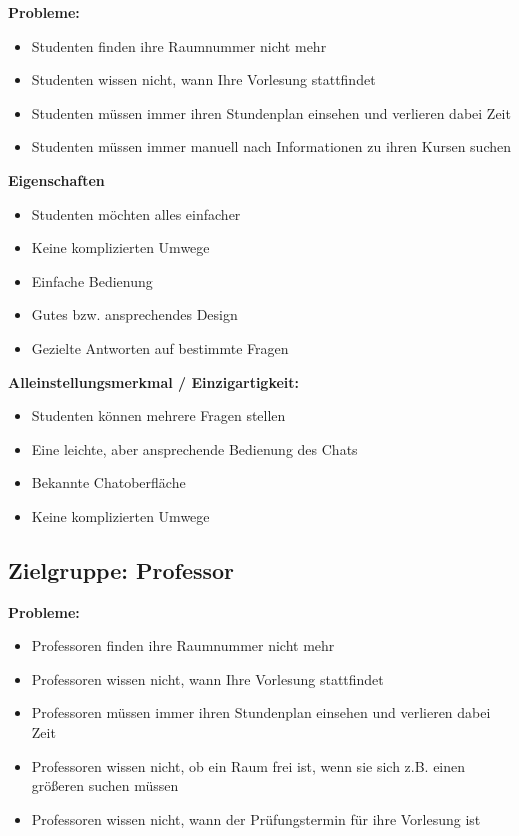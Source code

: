 \textbf{Probleme:}
\begin{itemize}
    \item Studenten finden ihre Raumnummer nicht mehr
    \item Studenten wissen nicht, wann Ihre Vorlesung stattfindet
    \item Studenten müssen immer ihren Stundenplan einsehen und verlieren dabei Zeit 
    \item Studenten müssen immer manuell nach Informationen zu ihren Kursen suchen
\end{itemize}
\medskip

\textbf{Eigenschaften}
\begin{itemize}
    \item Studenten möchten alles einfacher
    \item Keine komplizierten Umwege
    \item Einfache Bedienung
    \item Gutes bzw. ansprechendes Design
    \item Gezielte Antworten auf bestimmte Fragen
\end{itemize}
\medskip

\textbf{Alleinstellungsmerkmal / Einzigartigkeit:}
\begin{itemize}
    \item Studenten können mehrere Fragen stellen
    \item Eine leichte, aber ansprechende Bedienung des Chats
    \item Bekannte Chatoberfläche
    \item Keine komplizierten Umwege 
\end{itemize}

\subsection{Zielgruppe: Professor}

\textbf{Probleme:}
\begin{itemize}
    \item Professoren finden ihre Raumnummer nicht mehr
    \item Professoren wissen nicht, wann Ihre Vorlesung stattfindet
    \item Professoren müssen immer ihren Stundenplan einsehen und verlieren dabei Zeit
    \item Professoren wissen nicht, ob ein Raum frei ist, wenn sie sich z.B. einen größeren suchen müssen
    \item Professoren wissen nicht, wann der Prüfungstermin für ihre Vorlesung ist
\end{itemize}
\medskip

